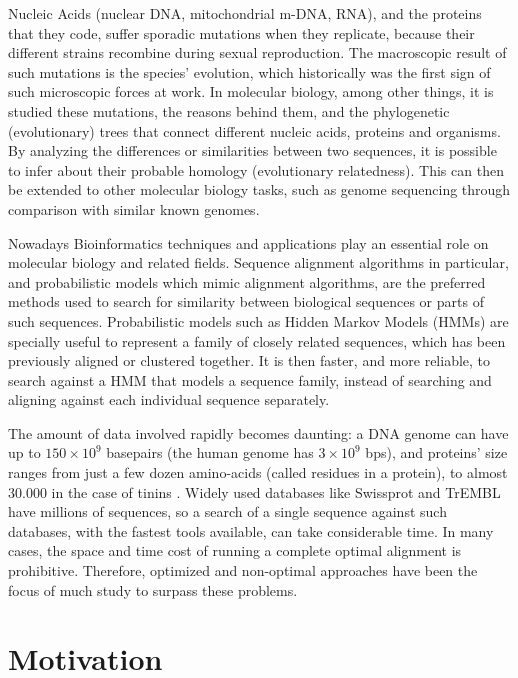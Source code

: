 \documentclass[defaultstyle,10pt,master,Helvetica]{thesis}
\begin{document}
Nucleic Acids (nuclear DNA, mitochondrial m-DNA, RNA), and the proteins that they code, suffer sporadic mutations when they replicate, because their different strains recombine during sexual reproduction. The macroscopic result of such mutations is the species' evolution, which historically was the first sign of such microscopic forces at work. In molecular biology, among other things, it is studied these mutations, the reasons behind them, and the phylogenetic (evolutionary) trees that connect different nucleic acids, proteins and organisms. By analyzing the differences or similarities between two sequences, it is possible to infer about their probable homology (evolutionary relatedness). This can then be extended to other molecular biology tasks, such as genome sequencing through comparison with similar known genomes.

Nowadays Bioinformatics techniques and applications play an essential role on molecular biology and related fields. Sequence alignment algorithms in particular, and probabilistic models which mimic alignment algorithms, are the preferred methods used to search for similarity between biological sequences or parts of such sequences. Probabilistic models such as Hidden Markov Models (HMMs) are specially useful to represent a family of closely related sequences, which has been previously aligned or clustered together. It is then faster, and more reliable, to search against a HMM that models a sequence family, instead of searching and aligning against each individual sequence separately.

The amount of data involved rapidly becomes daunting: a DNA genome can have up to $150 \times 10^{9}$ basepairs (the human genome has $3 \times 10^{9}$ bps), and proteins' size ranges from just a few dozen amino-acids (called residues in a protein), to almost 30.000 in the case of tinins \cite{brocchieri2005protein}. Widely used databases like Swissprot and TrEMBL have millions of sequences, so a search of a single sequence against such databases, with the fastest tools available, can take considerable time. In many cases, the space and time cost of running a complete optimal alignment is prohibitive. Therefore, optimized and non-optimal approaches have been the focus of much study to surpass these problems.






\section{Motivation}
\end{document}

